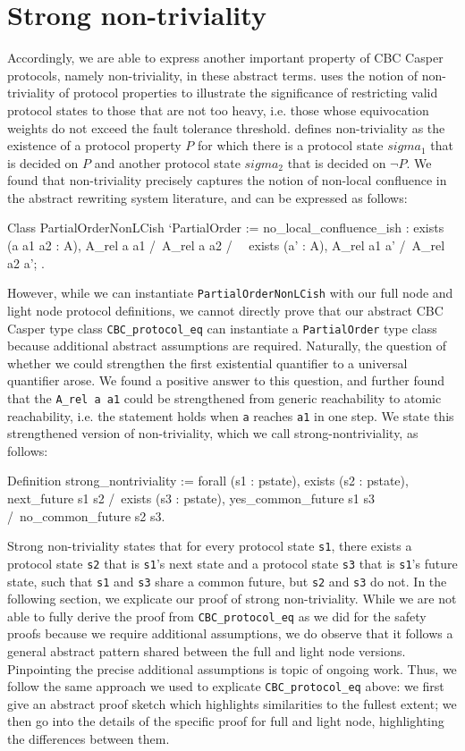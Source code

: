 \documentclass[runningheads]{llncs}
\begin{document}
\section{Strong non-triviality} 
Accordingly, we are able to express another important property of CBC Casper protocols, namely non-triviality, in these abstract terms. \cite{CBClight} uses the notion of non-triviality of protocol properties to illustrate the significance of restricting valid protocol states to those that are not too heavy, i.e. those whose equivocation weights do not exceed the fault tolerance threshold. \cite{CBClight} defines non-triviality as the existence of a protocol property $P$ for which there is a protocol state $sigma_1$ that is decided on $P$ and another protocol state $sigma_2$ that is decided on $\neg P$. We found that non-triviality precisely captures the notion of non-local confluence in the abstract rewriting system literature, and can be expressed as follows: 
\begin{coq}
	Class PartialOrderNonLCish `{PartialOrder} :=
	{ no_local_confluence_ish : exists (a a1 a2 : A),
		A_rel a a1 /\ A_rel a a2 /\
		~ exists (a' : A), A_rel a1 a' /\ A_rel a2 a';
	}.
\end{coq}
However, while we can instantiate \verb|PartialOrderNonLCish| with our full node and light node protocol definitions, we cannot directly prove that our abstract CBC Casper type class \verb|CBC_protocol_eq| can instantiate a \verb|PartialOrder| type class because additional abstract assumptions are required. 
Naturally, the question of whether we could strengthen the first existential quantifier to a universal quantifier arose. We found a positive answer to this question, and further found that the \verb|A_rel a a1| could be strengthened from generic reachability to atomic reachability, i.e. the statement holds when \verb|a| reaches \verb|a1| in one step. We state this strengthened version of non-triviality, which we call strong-nontriviality, as follows: 
\begin{coq}
	Definition strong_nontriviality :=
	forall (s1 : pstate),
	exists (s2 : pstate),
	next_future s1 s2 /\
	exists (s3 : pstate),
	yes_common_future s1 s3
	/\
	no_common_future s2 s3. 
\end{coq}
Strong non-triviality states that for every protocol state \verb|s1|, there exists a protocol state \verb|s2| that is \verb|s1|'s next state and a protocol state \verb|s3| that is \verb|s1|'s future state, such that \verb|s1| and \verb|s3| share a common future, but \verb|s2| and \verb|s3| do not. 
In the following section, we explicate our proof of strong non-triviality. While we are not able to fully derive the proof from \verb|CBC_protocol_eq| as we did for the safety proofs because we require additional assumptions, we do observe that it follows a general abstract pattern shared between the full and light node versions. Pinpointing the precise additional assumptions is topic of ongoing work. Thus, we follow the same approach we used to explicate \verb|CBC_protocol_eq| above: we first give an abstract proof sketch which highlights similarities to the fullest extent; we then go into the details of the specific proof for full and light node, highlighting the differences between them. 
\end{document}
